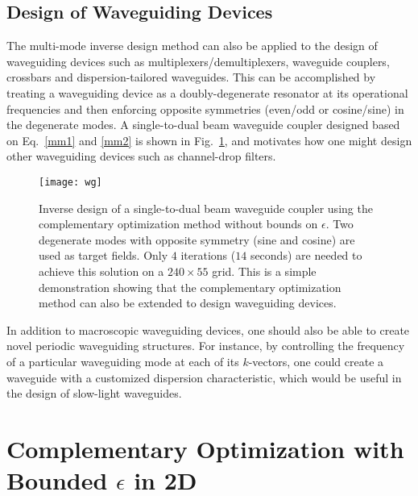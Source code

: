 \documentclass[10pt,letterpaper]{article}
\begin{document}
\subsection{Design of Waveguiding Devices}
The multi-mode inverse design method can also be applied to the design of waveguiding devices such as multiplexers/demultiplexers, waveguide couplers, crossbars and dispersion-tailored waveguides. This can be accomplished by treating a waveguiding device as a doubly-degenerate resonator at its operational frequencies and then enforcing opposite symmetries (even/odd or cosine/sine) in the degenerate modes. A single-to-dual beam waveguide coupler designed based on Eq.~\eqref{mm1} and \eqref{mm2} is shown in Fig.~\ref{wg pic}, and motivates how one might design other waveguiding devices such as channel-drop filters. 
\begin{figure}[htbp]\centering
\texttt{[image: wg]}
\caption{Inverse design of a single-to-dual beam waveguide coupler using the complementary optimization method without bounds on $\epsilon$. Two degenerate modes with opposite symmetry (sine and cosine) are used as target fields. Only $4$ iterations ($14$ seconds) are needed to achieve this solution on a $240\times 55$ grid. This is a simple demonstration showing that the complementary optimization method can also be extended to design waveguiding devices.}
\label{wg pic}
\end{figure}
In addition to macroscopic waveguiding devices, one should also be able to create novel periodic waveguiding structures. For instance, by controlling the frequency of a particular waveguiding mode at each of its $k$-vectors, one could create a waveguide with a customized dispersion characteristic, which would be useful in the design of slow-light waveguides.


\section{Complementary Optimization with Bounded $\epsilon$ in 2D}\label{sec:2Dbounded}
\end{document}
